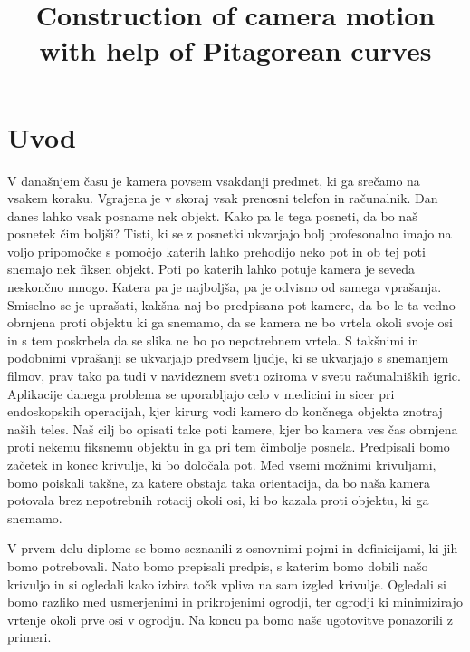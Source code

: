 \documentclass[mat1]{fmfdelo}
\title{Construction of camera motion with help of Pitagorean curves}
\begin{document}
\section{Uvod}
V današnjem času je kamera povsem vsakdanji predmet, ki ga srečamo na vsakem koraku. Vgrajena je v skoraj vsak prenosni telefon in računalnik. Dan danes lahko vsak posname nek objekt. Kako pa le tega posneti, da bo naš posnetek čim boljši? Tisti, ki se z posnetki ukvarjajo bolj profesonalno imajo na voljo pripomočke s pomočjo katerih lahko prehodijo neko pot in ob tej poti snemajo nek fiksen objekt. Poti po katerih lahko potuje kamera je seveda neskončno mnogo. Katera pa je najboljša, pa je odvisno od samega vprašanja.  Smiselno se je uprašati, kakšna naj bo predpisana pot kamere, da bo le ta vedno obrnjena proti objektu ki ga snemamo, da se kamera ne bo vrtela okoli svoje osi in s tem poskrbela da se slika ne bo po nepotrebnem vrtela. S takšnimi in podobnimi vprašanji se ukvarjajo predvsem ljudje, ki se ukvarjajo s snemanjem filmov, prav tako pa tudi v navideznem svetu oziroma v svetu računalniških igric. Aplikacije danega problema se uporabljajo celo v medicini in sicer pri endoskopskih operacijah, kjer kirurg vodi kamero do končnega objekta znotraj naših teles. Naš cilj bo opisati take poti kamere, kjer bo kamera ves čas obrnjena proti nekemu fiksnemu objektu in ga pri tem čimbolje posnela. Predpisali bomo začetek in konec krivulje, ki bo določala pot. Med vsemi možnimi krivuljami, bomo poiskali takšne, za katere obstaja taka orientacija, da bo naša kamera potovala brez nepotrebnih rotacij okoli osi, ki bo kazala proti objektu, ki ga snemamo.

V prvem delu diplome se bomo seznanili z osnovnimi pojmi in definicijami, ki jih bomo potrebovali. Nato bomo prepisali predpis, s katerim bomo dobili našo krivuljo in si ogledali kako izbira točk vpliva na sam izgled krivulje. Ogledali si bomo razliko med usmerjenimi in prikrojenimi ogrodji, ter ogrodji ki minimizirajo vrtenje okoli prve osi v ogrodju. Na koncu pa bomo naše ugotovitve ponazorili z primeri.

\end{document}
